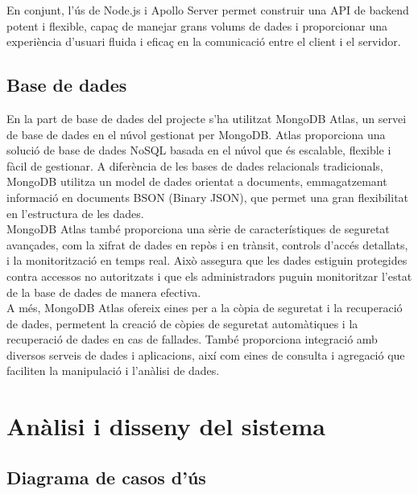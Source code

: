\documentclass[a4paper,12pt,twoside]{ThesisStyle}
\begin{document}
En conjunt, l'ús de Node.js i Apollo Server permet construir una API de backend potent i flexible, capaç de manejar grans volums de dades i proporcionar una experiència d'usuari fluida i eficaç en la comunicació entre el client i el servidor.



\section{Base de dades}
\label{subsec: Base de dades}


En la part de base de dades del projecte s'ha utilitzat MongoDB Atlas, un servei de base de dades en el núvol gestionat per MongoDB. Atlas proporciona una solució de base de dades NoSQL basada en el núvol que és escalable, flexible i fàcil de gestionar. A diferència de les bases de dades relacionals tradicionals, MongoDB utilitza un model de dades orientat a documents, emmagatzemant informació en documents BSON (Binary JSON), que permet una gran flexibilitat en l'estructura de les dades.\\

MongoDB Atlas també proporciona una sèrie de característiques de seguretat avançades, com la xifrat de dades en repòs i en trànsit, controls d'accés detallats, i la monitorització en temps real. Això assegura que les dades estiguin protegides contra accessos no autoritzats i que els administradors puguin monitoritzar l'estat de la base de dades de manera efectiva.\\

A més, MongoDB Atlas ofereix eines per a la còpia de seguretat i la recuperació de dades, permetent la creació de còpies de seguretat automàtiques i la recuperació de dades en cas de fallades. També proporciona integració amb diversos serveis de dades i aplicacions, així com eines de consulta i agregació que faciliten la manipulació i l'anàlisi de dades.





\chapter{Anàlisi i disseny del sistema}
\label{chp:analisi}


\section{Diagrama de casos d'ús}
\label{sec: Diagrama de casos d'ús}
\end{document}
